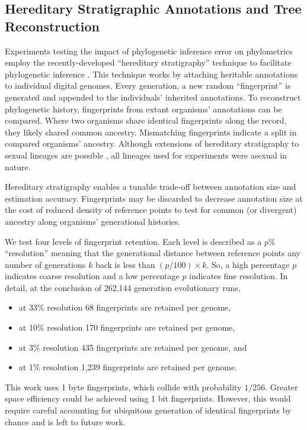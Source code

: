 \subsection{Hereditary Stratigraphic Annotations and Tree Reconstruction}

Experiments testing the impact of phylogenetic inference error on phylometrics employ the recently-developed ``hereditary stratigraphy'' technique to facilitate phylogenetic inference \citep{moreno2022hstrat}.
This technique works by attaching heritable annotations to individual digital genomes.
Every generation, a new random ``fingerprint'' is generated and appended to the individuals' inherited annotations.
To reconstruct phylogenetic history, fingerprints from extant organisms' annotations can be compared.
Where two organisms share identical fingerprints along the record, they likely shared common ancestry.
Mismatching fingerprints indicate a split in compared organisms' ancestry.
Although extensions of hereditary stratigraphy to sexual lineages are possible \citep{moreno2024methods}, all lineages used for experiments were asexual in nature.

Hereditary stratigraphy enables a tunable trade-off between annotation size and estimation accuracy.
Fingerprints may be discarded to decrease annotation size at the cost of reduced density of reference points to test for common (or divergent) ancestry along organisms' generational histories.

We test four levels of fingerprint retention.
Each level is described as a $p\%$ ``resolution'' meaning that the generational distance between reference points any number of generations $k$ back is less than $(p / 100) \times k$.
So, a high percentage $p$ indicates coarse resolution and a low percentage $p$ indicates fine resolution.
In detail, at the conclusion of 262,144 generation evolutionary runs,
\begin{itemize}
  \item at 33\% resolution 68 fingerprints are retained per genome,
  \item at 10\% resolution 170 fingerprints are retained per genome,
  \item at 3\% resolution 435 fingerprints are retained per genome, and
  \item at 1\% resolution 1,239 fingerprints are retained per genome.
\end{itemize}

This work uses 1 byte fingerprints, which collide with probability $1/256$.
Greater space efficiency could be achieved using 1 bit fingerprints.
However, this would require careful accounting for ubiquitous generation of identical fingerprints by chance and is left to future work.

